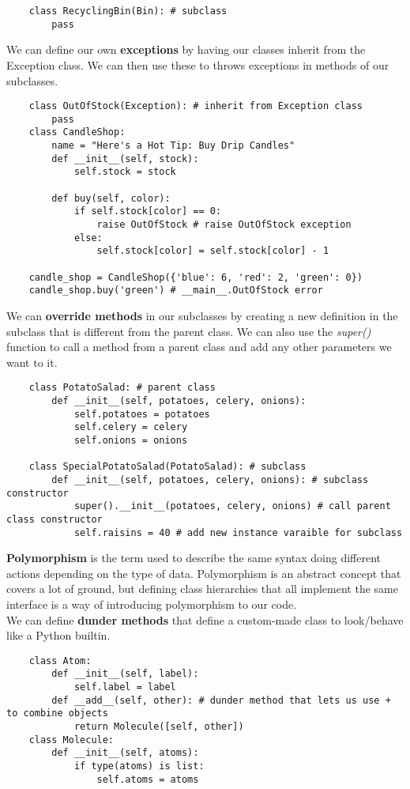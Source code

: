 \documentclass[11pt, a4paper]{article}
\begin{document}
\begin{spacing}{1.1}
\begin{lstlisting}
	class RecyclingBin(Bin): # subclass
		pass \end{lstlisting}\vspace*{1mm}
	We can define our own \textbf{exceptions} by having our classes inherit from the Exception class. We can then use these to throws exceptions in methods of our subclasses. 
	\begin{lstlisting}
	class OutOfStock(Exception): # inherit from Exception class
		pass
	class CandleShop:
		name = "Here's a Hot Tip: Buy Drip Candles"
		def __init__(self, stock):
			self.stock = stock
	
		def buy(self, color):
			if self.stock[color] == 0:
				raise OutOfStock # raise OutOfStock exception
			else:
				self.stock[color] = self.stock[color] - 1
	
	candle_shop = CandleShop({'blue': 6, 'red': 2, 'green': 0})
	candle_shop.buy('green') # __main__.OutOfStock error \end{lstlisting} \newpage
	\noindent We can \textbf{override methods} in our subclasses by creating a new definition in the subclass that is different from the parent class. We can also use the \textit{super()} function to call a method from a parent class and add any other parameters we want to it. 
	\begin{lstlisting}
	class PotatoSalad: # parent class
		def __init__(self, potatoes, celery, onions):
			self.potatoes = potatoes
			self.celery = celery
			self.onions = onions
	
	class SpecialPotatoSalad(PotatoSalad): # subclass
		def __init__(self, potatoes, celery, onions): # subclass constructor
			super().__init__(potatoes, celery, onions) # call parent class constructor
			self.raisins = 40 # add new instance varaible for subclass \end{lstlisting}\vspace*{1mm}
	\textbf{Polymorphism} is the term used to describe the same syntax doing different actions depending on the type of data. Polymorphism is an abstract concept that covers a lot of ground, but defining class hierarchies that all implement the same interface is a way of introducing polymorphism to our code. \vspace*{1mm} \\
	We can define \textbf{dunder methods} that define a custom-made class to look/behave like a Python builtin. 
	\begin{lstlisting}
	class Atom:
		def __init__(self, label):
			self.label = label
		def __add__(self, other): # dunder method that lets us use + to combine objects
			return Molecule([self, other])	
	class Molecule:
		def __init__(self, atoms):
			if type(atoms) is list:
				self.atoms = atoms
	

\end{lstlisting}
\end{spacing}
\end{document}
